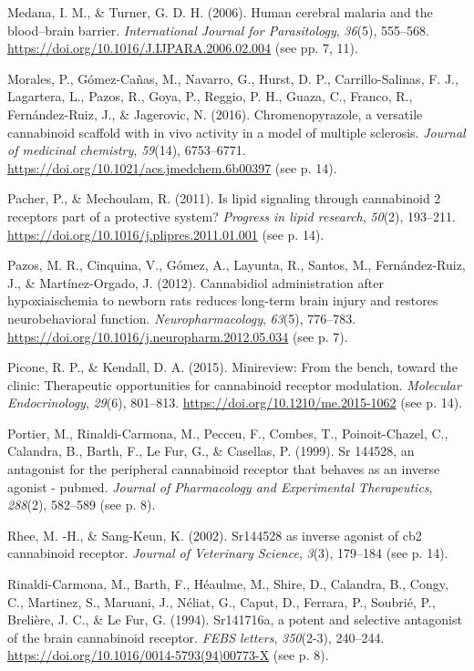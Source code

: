 \documentclass[empirical, authordate, issue]{jote-new-article}
\begin{document}
Medana, I. M., \& Turner, G. D. H. (2006). Human cerebral malaria and the blood–brain barrier. \emph{International Journal for Parasitology}, \emph{36}(5), 555–568. \url{https://doi.org/10.1016/J.IJPARA.2006.02.004} (see pp. 7, 11).

Morales, P., Gómez-Cañas, M., Navarro, G., Hurst, D. P., Carrillo-Salinas, F. J., Lagartera, L., Pazos, R., Goya, P., Reggio, P. H., Guaza, C., Franco, R., Fernández-Ruiz, J., \& Jagerovic, N. (2016).
Chromenopyrazole, a versatile cannabinoid scaffold with in vivo activity in a model of multiple sclerosis. \emph{Journal of medicinal chemistry}, \emph{59}(14), 6753–6771. \url{https://doi.org/10.1021/acs.jmedchem.6b00397} (see p. 14).

Pacher, P., \& Mechoulam, R. (2011). Is lipid signaling through cannabinoid 2 receptors part of a protective system? \emph{Progress in lipid research}, \emph{50}(2), 193–211. \url{https://doi.org/10.1016/j.plipres.2011.01.001} (see p. 14).

Pazos, M. R., Cinquina, V., Gómez, A., Layunta, R., Santos, M., Fernández-Ruiz, J., \& Martínez-Orgado, J. (2012). Cannabidiol administration after hypoxiaischemia to newborn rats reduces long-term brain injury and restores neurobehavioral function. \emph{Neuropharmacology}, \emph{63}(5), 776–783. \url{https://doi.org/10.1016/j.neuropharm.2012.05.034} (see p. 7).

Picone, R. P., \& Kendall, D. A. (2015). Minireview: From the bench, toward the clinic: Therapeutic opportunities for cannabinoid receptor modulation. \emph{Molecular Endocrinology}, \emph{29}(6), 801–813. \url{https://doi.org/10.1210/me.2015-1062} (see p. 14).

Portier, M., Rinaldi-Carmona, M., Pecceu, F., Combes, T., Poinoit-Chazel, C., Calandra, B., Barth, F., Le Fur, G., \& Casellas, P. (1999). Sr 144528, an antagonist for the peripheral cannabinoid receptor that behaves as an inverse agonist - pubmed. \emph{Journal of Pharmacology and Experimental Therapeutics}, \emph{288}(2), 582–589 (see p. 8).

Rhee, M. -H., \& Sang-Keun, K. (2002). Sr144528 as inverse agonist of cb2 cannabinoid receptor. \emph{Journal of Veterinary Science}, \emph{3}(3), 179–184 (see p. 14).

Rinaldi-Carmona, M., Barth, F., Héaulme, M., Shire, D., Calandra, B., Congy, C., Martinez, S., Maruani, J., Néliat, G., Caput, D., Ferrara, P., Soubrié, P., Brelière, J. C., \& Le Fur, G. (1994). Sr141716a, a potent and selective antagonist of the brain cannabinoid receptor. \emph{FEBS letters}, \emph{350}(2-3), 240–244. \url{https://doi.org/10.1016/0014-5793(94)00773-X} (see p. 8).
\end{document}
